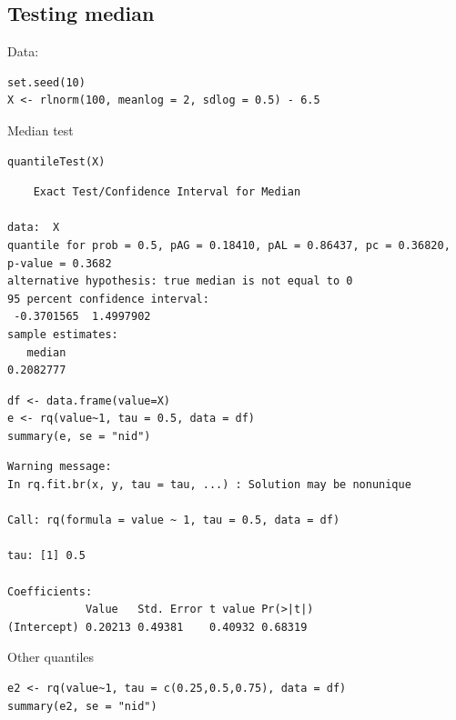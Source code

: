 \documentclass{article}
\begin{document}
\subsection{Testing median}
\label{sec:org9ccbe0c}

Data:
\lstset{language=r,label= ,caption= ,captionpos=b,numbers=none}
\begin{lstlisting}
set.seed(10)
X <- rlnorm(100, meanlog = 2, sdlog = 0.5) - 6.5
\end{lstlisting}

Median test
\lstset{language=r,label= ,caption= ,captionpos=b,numbers=none}
\begin{lstlisting}
quantileTest(X)
\end{lstlisting}

\begin{verbatim}
	Exact Test/Confidence Interval for Median

data:  X
quantile for prob = 0.5, pAG = 0.18410, pAL = 0.86437, pc = 0.36820, p-value = 0.3682
alternative hypothesis: true median is not equal to 0
95 percent confidence interval:
 -0.3701565  1.4997902
sample estimates:
   median 
0.2082777
\end{verbatim}

\lstset{language=r,label= ,caption= ,captionpos=b,numbers=none}
\begin{lstlisting}
df <- data.frame(value=X)
e <- rq(value~1, tau = 0.5, data = df)
summary(e, se = "nid")
\end{lstlisting}

\begin{verbatim}
Warning message:
In rq.fit.br(x, y, tau = tau, ...) : Solution may be nonunique

Call: rq(formula = value ~ 1, tau = 0.5, data = df)

tau: [1] 0.5

Coefficients:
            Value   Std. Error t value Pr(>|t|)
(Intercept) 0.20213 0.49381    0.40932 0.68319
\end{verbatim}

Other quantiles
\lstset{language=r,label= ,caption= ,captionpos=b,numbers=none}
\begin{lstlisting}
e2 <- rq(value~1, tau = c(0.25,0.5,0.75), data = df)
summary(e2, se = "nid")
\end{lstlisting}
\end{document}
